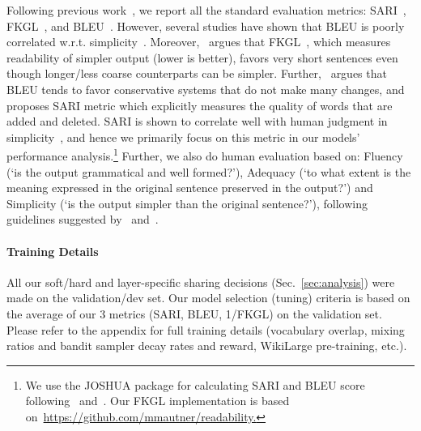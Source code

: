\documentclass[11pt]{article}
\def\secref#1{Sec.~\ref{#1}}
\begin{document}
Following previous work~\cite{zhang2017dress}, we report all the standard evaluation metrics: SARI~\cite{Xu2016OptimizingSM}, FKGL~\cite{kincaid1975fkgl}, and BLEU~\cite{Papineni2002BleuAM}. However, several studies have shown that BLEU is poorly correlated w.r.t. simplicity~\cite{Zhu2010AMT,vstajner2015deeper,Xu2016OptimizingSM}. Moreover,~ argues that FKGL~\cite{kincaid1975fkgl}, which measures readability of simpler output (lower is better), favors very short sentences even though longer/less coarse counterparts can be simpler. Further,~ argues that BLEU tends to favor conservative systems that do not make many changes, and proposes SARI metric which explicitly measures the quality of words that are added and deleted.
SARI is shown to correlate well with human judgment in simplicity~\cite{Xu2016OptimizingSM},
and hence we primarily focus on this metric in our models' performance analysis.\footnote{We use the JOSHUA package for calculating SARI and BLEU score following~ and~. Our FKGL implementation is based on~\url{https://github.com/mmautner/readability.}} 
Further, we also do human evaluation based on: Fluency (`is the output grammatical and well formed?'), Adequacy (`to what extent is the meaning expressed in the original sentence preserved in the output?') and Simplicity (`is the output simpler than the original sentence?'), following guidelines suggested by~ and~.

\paragraph{Training Details}
\label{subsec:training}
All our soft/hard and layer-specific sharing decisions (\secref{sec:analysis}) were made on the validation/dev set. Our model selection (tuning) criteria is based on the average of our 3 metrics (SARI, BLEU, 1/FKGL) on the validation set. Please refer to the appendix for full training details (vocabulary overlap, mixing ratios and bandit sampler decay rates and reward, WikiLarge pre-training, etc.).
\end{document}
